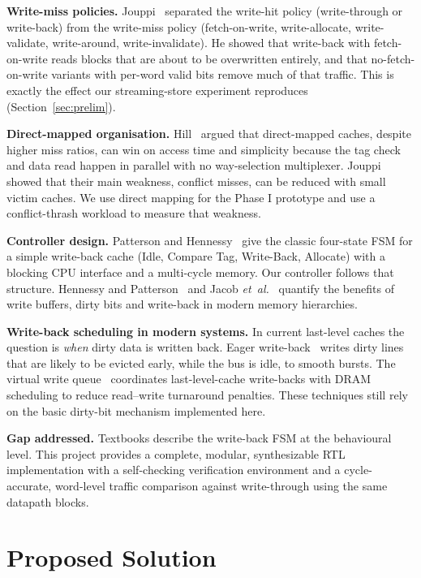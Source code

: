 \documentclass[conference]{IEEEtran}
\begin{document}
\textbf{Write-miss policies.} Jouppi~\cite{jouppi93} separated the write-hit
policy (write-through or write-back) from the write-miss policy (fetch-on-write,
write-allocate, write-validate, write-around, write-invalidate). He showed that
write-back with fetch-on-write reads blocks that are about to be overwritten
entirely, and that no-fetch-on-write variants with per-word valid bits remove
much of that traffic. This is exactly the effect our streaming-store experiment
reproduces (Section~\ref{sec:prelim}).

\textbf{Direct-mapped organisation.} Hill~\cite{hill88} argued that direct-mapped
caches, despite higher miss ratios, can win on access time and simplicity because
the tag check and data read happen in parallel with no way-selection multiplexer.
Jouppi~\cite{jouppi90} showed that their main weakness, conflict misses, can be
reduced with small victim caches. We use direct mapping for the Phase I prototype
and use a conflict-thrash workload to measure that weakness.

\textbf{Controller design.} Patterson and Hennessy~\cite{ph_cod} give the classic
four-state FSM for a simple write-back cache (Idle, Compare Tag, Write-Back,
Allocate) with a blocking CPU interface and a multi-cycle memory. Our controller
follows that structure. Hennessy and Patterson~\cite{hp_quant} and Jacob
\emph{et~al.}~\cite{jacob} quantify the benefits of write buffers, dirty bits and
write-back in modern memory hierarchies.

\textbf{Write-back scheduling in modern systems.} In current last-level caches the
question is \emph{when} dirty data is written back. Eager write-back~\cite{lee00}
writes dirty lines that are likely to be evicted early, while the bus is idle,
to smooth bursts. The virtual write queue~\cite{stuecheli10} coordinates
last-level-cache write-backs with DRAM scheduling to reduce read--write turnaround
penalties. These techniques still rely on the basic dirty-bit mechanism
implemented here.

\textbf{Gap addressed.} Textbooks describe the write-back FSM at the
behavioural level. This project provides a complete, modular, synthesizable RTL
implementation with a self-checking verification environment and a
cycle-accurate, word-level traffic comparison against write-through using the same
datapath blocks.

\section{Proposed Solution}
\end{document}
